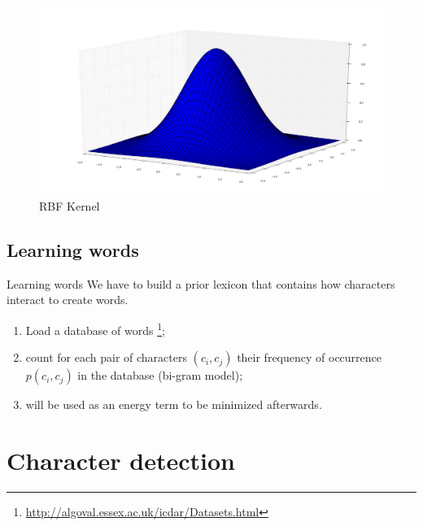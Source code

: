 \documentclass[handout]{beamer}
\begin{document}
\begin{frame}
\begin{figure}%
\includegraphics[width=\columnwidth]{figures/blob.png}%
\caption{RBF Kernel}%
\label{RBFKernel}%
\end{figure}
\end{frame}



\subsection{Learning words}

\begin{frame}{Learning words}
We have to build a prior lexicon that contains how characters interact to create words.
\begin{enumerate}
	\item Load a database of words \cite{ICDARword}\footnote{\url{http://algoval.essex.ac.uk/icdar/Datasets.html}};
	\item count for each pair of characters $(c_i,c_j)$ their frequency of occurrence $p(c_i,c_j)$ in the database (bi-gram model);
	\item will be used as an energy term to be minimized afterwards.
\end{enumerate}
\end{frame}





\section{Character detection}

\end{document}
